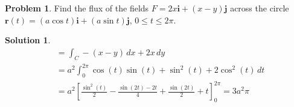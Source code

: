 \documentclass[10pt]{article}
\theoremstyle{definition}
\newtheorem{problem}{Problem}
\newtheorem{soln}{Solution}
\newcommand{\ui}{\mathbf{i}}
\newcommand{\uj}{\mathbf{j}}
\begin{document}
\begin{problem}
Find the flux of the fields $F = 2x\ui + (x - y)\uj$ across the circle $\mathbf{r}(t) =(a\cos t)\ui + (a\sin t)\uj,\,0\leq t \leq 2\pi$.
\end{problem}
\begin{soln}
  \begin{align*}
     & =\int_C-(x-y)\,dx+2x\,dy \\
     & =a^2\int_0^{2\pi}\cos(t)\sin(t)+\sin^2(t)+2\cos^2(t)\,dt \\
     & =a^2\left[\frac{\sin^2(t)}{2}-\frac{\sin(2t)-2t}{4}+\frac{\sin(2t)}{2}+t\right]_0^{2\pi}=3a^2\pi \\
  \end{align*}
\end{soln}
\end{document}
